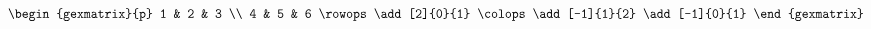 \documentclass{article}
\begin{document}
\begin{equation*}
    \begin{gexmatrix}{p}
        1 & 2 & 3 \\ 
        4 & 5 & 6
        \rowops 
        \add[2]{0}{1}
        \colops
        \add[-1]{1}{2}
        \add[-1]{0}{1}
    \end{gexmatrix}
\end{equation*}
\end{document}
